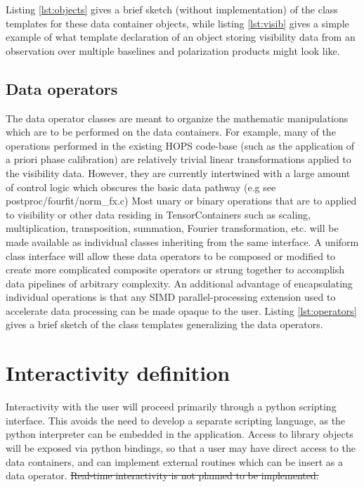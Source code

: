 \documentclass[hidelinks]{article}
\let\Oldsection\section
\renewcommand{\section}{\FloatBarrier\Oldsection}
\let\Oldsubsection\subsection
\renewcommand{\subsection}{\FloatBarrier\Oldsubsection}
\begin{document}
Listing \ref{lst:objects} gives a brief sketch (without implementation) of the class templates for these data container objects, while listing \ref{lst:visib} gives a simple example of what template declaration of an object storing visibility data from an observation over multiple baselines and polarization products might look like.





\subsection{Data operators}

The data operator classes are meant to organize the mathematic manipulations which are to be performed on the data containers. For example, many of the operations performed in the existing HOPS code-base (such as the application of a priori phase calibration) are relatively trivial linear transformations applied to the visibility data. However, they are currently intertwined with a large amount of control logic which obscures the basic data pathway (e.g see postproc/fourfit/norm\_fx.c)
Most unary or binary operations that are to applied to visibility or other data residing in TensorContainers such as scaling, multiplication, transposition, summation, Fourier transformation, etc. will be made available as individual classes inheriting from the same interface. A uniform class interface will allow these data operators to be composed or modified to create more complicated composite operators or strung together to accomplish data pipelines of arbitrary complexity. An additional advantage of encapsulating individual operations is that any SIMD parallel-processing extension used to accelerate data processing can be made opaque to the user. Listing \ref{lst:operators} gives a brief sketch of the class templates generalizing the data operators.





\section{Interactivity definition}

Interactivity with the user will proceed primarily through a python scripting interface. This avoids the need to develop a separate scripting language, as the python interpreter can be embedded in the application. Access to library objects will be exposed via python bindings, so that a user may have direct access to the data containers, and can implement
external routines which can be insert as a data operator. \st{Real-time interactivity is not planned to be implemented.}
\end{document}

